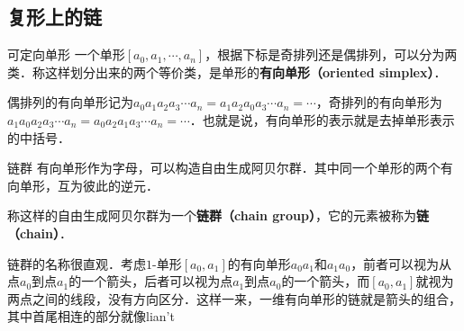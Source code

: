 



\subsection{复形上的链}

\begin{definition}{可定向单形}
一个单形$[a_0, a_1, \cdots, a_n]$，根据下标是奇排列还是偶排列，可以分为两类．称这样划分出来的两个等价类，是单形的\textbf{有向单形（oriented simplex）}．

偶排列的有向单形记为$a_0a_1a_2a_3\cdots a_n=a_1a_2a_0a_3\cdots a_n=\cdots$，奇排列的有向单形为$a_1a_0a_2a_3\cdots a_n=a_0a_2a_1a_3\cdots a_n=\cdots$．也就是说，有向单形的表示就是去掉单形表示的中括号．
\end{definition}

\begin{definition}{链群}
有向单形作为字母，可以构造自由生成阿贝尔群．其中同一个单形的两个有向单形，互为彼此的逆元．

称这样的自由生成阿贝尔群为一个\textbf{链群（chain group）}，它的元素被称为\textbf{链（chain）}．
\end{definition}

链群的名称很直观．考虑$1$-单形$[a_0, a_1]$的有向单形$a_0a_1$和$a_1a_0$，前者可以视为从点$a_0$到点$a_1$的一个箭头，后者可以视为点$a_1$到点$a_0$的一个箭头，而$[a_0, a_1]$就视为两点之间的线段，没有方向区分．这样一来，一维有向单形的链就是箭头的组合，其中首尾相连的部分就像lian't












